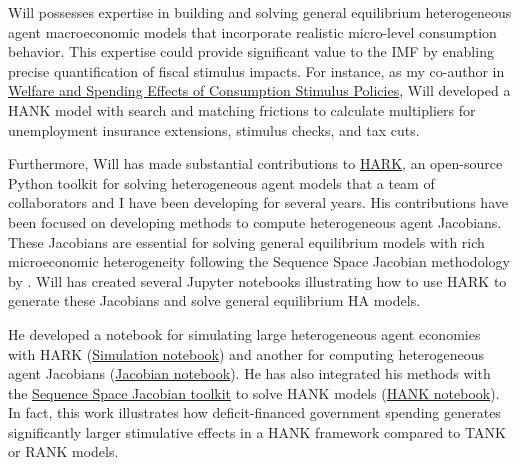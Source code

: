 \documentclass[\econtexRoot/Letter]{subfiles}
\begin{document}
\notinsubfile{\renewcommand{\econtexRoot}{.}}



Will possesses expertise in building and solving general equilibrium heterogeneous agent macroeconomic models that incorporate realistic micro-level consumption behavior. This expertise could provide significant value to the IMF by enabling precise quantification of fiscal stimulus impacts. For instance, as my co-author in \href{https://github.com/llorracc/HAFiscal/blob/master/HAFiscal.pdf}{Welfare and Spending Effects of Consumption Stimulus Policies}, Will developed a HANK model with search and matching frictions to calculate multipliers for unemployment insurance extensions, stimulus checks, and tax cuts.

Furthermore, Will has made substantial contributions to \href{https://github.com/econ-ark/HARK}{HARK}, an open-source Python toolkit for solving heterogeneous agent models that a team of collaborators and I have been developing for several years.  His contributions have been focused on developing methods to compute heterogeneous agent Jacobians. These Jacobians are essential for solving general equilibrium models with rich microeconomic heterogeneity following the Sequence Space Jacobian methodology by \cite{Auclert2021}.
Will has created several Jupyter notebooks illustrating how to use HARK to generate these Jacobians and solve general equilibrium HA models. %

He developed a notebook for simulating large heterogeneous agent economies with HARK (\href{https://github.com/econ-ark/HARK/blob/master/examples/ConsNewKeynesianModel/Transition_Matrix_Example.ipynb}{Simulation notebook}) and another for computing heterogeneous agent Jacobians (\href{https://github.com/econ-ark/HARK/blob/master/examples/ConsNewKeynesianModel/Jacobian_Example.ipynb}{Jacobian notebook}). He has also integrated his methods with the \href{https://github.com/shade-econ/sequence-jacobian}{Sequence Space Jacobian toolkit} to solve HANK models (\href{https://github.com/econ-ark/HARK/blob/master/examples/ConsNewKeynesianModel/SSJ_example.ipynb}{HANK notebook}). In fact, this work illustrates how deficit-financed government spending generates significantly larger stimulative effects in a HANK framework compared to TANK or RANK models.
\end{document}
